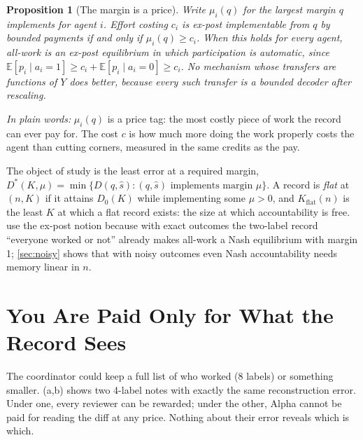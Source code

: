 \documentclass[sigconf,anonymous,acmthm=false]{acmart}
\theoremstyle{acmplain}
\newtheorem{proposition}{Proposition}
\theoremstyle{acmdefinition}
\newcommand{\plain}[1]{\par\smallskip\noindent\textit{In plain words:} #1\par\smallskip}
\newcommand{\E}{\mathbb{E}}
\newcommand{\Kflat}{K_{\mathrm{flat}}}
\newcommand{\shat}{\hat{s}}
\newcommand{\A}{\textsf{Alpha}}
\begin{document}
\begin{proposition}[The margin is a price]\label{prop:threshold}
Write $\mu_i(q)$ for the largest margin $q$ implements for agent $i$. Effort costing $c_i$
is ex-post implementable from $q$ by bounded payments if and only if $\mu_i(q)\ge c_i$.
When this holds for every agent, all-work is an ex-post equilibrium in which participation
is automatic, since $\E[p_i\mid a_i=1]\ge c_i+\E[p_i\mid a_i=0]\ge c_i$. No mechanism whose
transfers are functions of $Y$ does better, because every such transfer is a bounded
decoder after rescaling.
\end{proposition}

\plain{$\mu_i(q)$ is a price tag: the most costly piece of work the record can ever pay
for. The cost $c$ is how much more doing the work properly costs the agent than cutting
corners, measured in the same credits as the pay.}

The object of study is the least error at a required margin,
$D^*(K,\mu)=\min\{D(q,\shat):(q,\shat)\text{ implements margin }\mu\}$. A record is
\emph{flat} at $(n,K)$ if it attains $D_0(K)$ while implementing some $\mu>0$, and
$\Kflat(n)$ is the least $K$ at which a flat record exists: the size at which
accountability is free.  use the ex-post notion because with
exact outcomes the two-label record ``everyone worked or not'' already makes all-work a
Nash equilibrium with margin 1; \cref{sec:noisy} shows that with noisy outcomes even Nash
accountability needs memory linear in $n$.

\section{You Are Paid Only for What the Record Sees}\label{sec:elim}

\begin{story}
The coordinator could keep a full list of who worked (8 labels) or something smaller.
(a,b) shows two 4-label notes with exactly the same reconstruction error.
Under one, every reviewer can be rewarded; under the other, \A{} cannot be paid for reading
the diff at any price. Nothing about their error reveals which is which.
\end{story}
\end{document}
